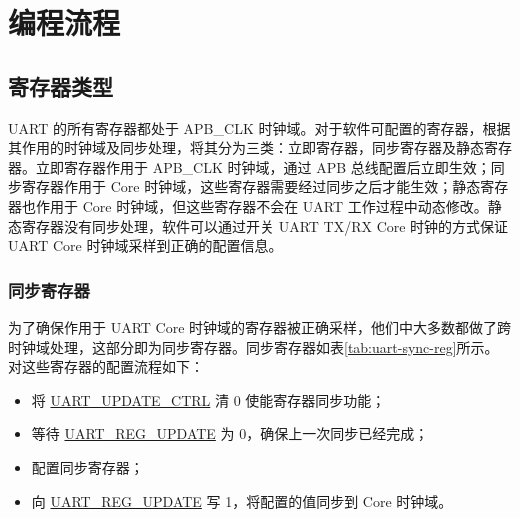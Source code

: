 \documentclass[main\_\_CN.tex]{subfiles}
\begin{document}
\section{编程流程}\label{sec:uart-program}

\subsection{寄存器类型}

UART 的所有寄存器都处于 APB\_CLK 时钟域。对于软件可配置的寄存器，根据其作用的时钟域及同步处理，将其分为三类：立即寄存器，同步寄存器及静态寄存器。立即寄存器作用于 APB\_CLK 时钟域，通过 APB 总线配置后立即生效；同步寄存器作用于 Core 时钟域，这些寄存器需要经过同步之后才能生效；静态寄存器也作用于 Core 时钟域，但这些寄存器不会在 UART 工作过程中动态修改。静态寄存器没有同步处理，软件可以通过开关 UART TX/RX Core 时钟的方式保证 UART Core 时钟域采样到正确的配置信息。

\subsubsection{同步寄存器}

为了确保作用于 UART Core 时钟域的寄存器被正确采样，他们中大多数都做了跨时钟域处理，这部分即为同步寄存器。同步寄存器如表\ref{tab:uart-sync-reg}所示。对这些寄存器的配置流程如下：

\begin{itemize}
    \item 将 \hyperref[fielddesc:UARTUPDATECTRL]{UART\_UPDATE\_CTRL} 清 0 使能寄存器同步功能；
    \item 等待 \hyperref[fielddesc:UARTREGUPDATE]{UART\_REG\_UPDATE} 为 0，确保上一次同步已经完成；
    \item 配置同步寄存器；
    \item 向 \hyperref[fielddesc:UARTREGUPDATE]{UART\_REG\_UPDATE} 写 1，将配置的值同步到 Core 时钟域。
\end{itemize}
\end{document}
